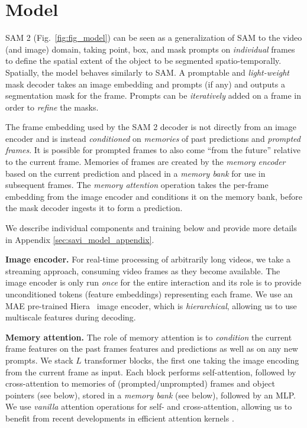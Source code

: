 \documentclass[]{fairmeta}
\renewcommand{\paragraph}[1]{\vspace{1.25mm}\noindent\textbf{#1}}
\newcommand{\figref}[1]{Fig.~\ref{#1}}
\renewcommand{\paragraph}[1]{\vspace{1.25mm}\noindent\textbf{#1}}
\begin{document}
\section{Model}
\label{sec:model}

SAM 2 (\figref{fig:fig_model}) can be seen as a generalization of SAM to the video (and image) domain, taking point, box, and mask prompts on \textit{individual} frames to define the spatial extent of the object to be segmented spatio-temporally. Spatially, the model behaves similarly to SAM. A promptable and \textit{light-weight} mask decoder takes an image embedding and prompts (if any) and outputs a segmentation mask for the frame. Prompts can be \textit{iteratively} added on a frame in order to \textit{refine} the masks.

The frame embedding used by the SAM 2 decoder is not directly from an image encoder and is instead \textit{conditioned} on \textit{memories} of past predictions and \textit{prompted frames}.
It is possible for prompted frames to also come ``from the future'' relative to the current frame. Memories of frames are created by the \textit{memory encoder} based on the current prediction and placed in a \textit{memory bank} for use in subsequent frames. The \textit{memory attention} operation takes the per-frame embedding from the image encoder and conditions it on the memory bank, before  the mask decoder ingests it to form a prediction. 

We describe individual components and training below and provide more details in Appendix \ref{sec:savi_model_appendix}. 

\paragraph{Image encoder.} For real-time processing of arbitrarily long videos, we take a streaming approach, consuming video frames as they become available. The image encoder is only run \textit{once} for the entire interaction and its role is to provide unconditioned tokens (feature embeddings) representing each frame. We use an MAE \citep{mae} pre-trained Hiera~\citep{hiera, abswin} image encoder, which is \textit{hierarchical}, allowing us to use multiscale features during decoding.


\paragraph{Memory attention.} The role of memory attention is to \textit{condition} the current frame features on the past frames features and predictions as well as on any new prompts. We stack $L$ transformer blocks, the first one taking the image encoding from the current frame as input. Each block performs self-attention, followed by cross-attention to memories of (prompted/unprompted) frames and object pointers (see below), stored in a \textit{memory bank} (see below), followed by an MLP. We use \textit{vanilla} attention operations for self- and cross-attention, allowing us to benefit from recent developments in efficient attention kernels \citep{flashattentionv2}. 
\end{document}
